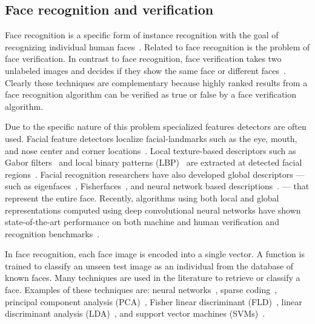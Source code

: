     \subsection{Face recognition and verification}
        Face recognition is a specific form of instance recognition with the goal of recognizing individual human
        faces~\cite{zhao_face_2003, huang_labeled_2007}. Related to face recognition is the problem of face
        verification. In contrast to face recognition, face verification takes two unlabeled images and decides if
        they show the same face or different faces~\cite{taigman_deepface_2014}. Clearly these techniques are
        complementary because highly ranked results from a face recognition algorithm can be verified as true or
        false by a face verification algorithm.

        Due to the specific nature of this problem specialized features detectors are often used. Facial feature
        detectors localize facial-landmarks such as the eye, mouth, and nose center and corner
        locations~\cite{dantone_real_time_2012, berg_tom_vs_pete_2012}. Local texture-based descriptors such as Gabor
        filters~\cite{liu_gabor_2002, zhang_histogram_2007, shen_review_2006} and local binary patterns
        (LBP)~\cite{ahonen_face_2006, chen_blessing_2013} are extracted at detected facial
        regions~\cite{belhumeur_localizing_2011}. Facial recognition researchers have also developed global
        descriptors --- such as eigenfaces~\cite{turk_eigenfaces_1991},
        Fisherfaces~\cite{belhumeur_eigenfaces_1997}, and neural network based
        descriptions~\cite{lawrence_face_1997, taigman_deepface_2014}. --- that represent the entire face.
        Recently, algorithms using both local and global representations computed using deep convolutional neural
        networks have shown state-of-the-art performance on both machine and human verification and recognition
        benchmarks~\cite{taigman_deepface_2014}.

        In face recognition, each face image is encoded into a single vector. A function is trained to classify an
        unseen test image as an individual from the database of known faces. Many techniques are used in the
        literature to retrieve or classify a face. Examples of these techniques are: neural
        networks~\cite{turk_eigenfaces_1991, taigman_deepface_2014}, sparse coding~\cite{wright_robust_2009,
        jiang_label_2013}, principal component analysis (PCA)~\cite{craw_face_1992}, Fisher linear discriminant
        (FLD)~\cite{liu_robust_2000}, linear discriminant analysis (LDA)~\cite{lu_face_2003}, and support vector
        machines (SVMs)~\cite{phillips_support_1999, levy_svm_minus_2013}.

